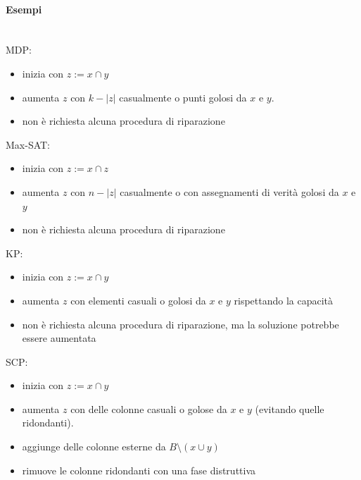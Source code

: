 \documentclass{article}
\begin{document}
\paragraph{Esempi}\mbox{}\\
MDP:
\begin{itemize}
    \item inizia con $z:=x\cap y$
    \item aumenta $z$ con $k-|z|$ casualmente o punti golosi da $x$ e $y$.
    \item non è richiesta alcuna procedura di riparazione
\end{itemize}
Max-SAT:
\begin{itemize}
    \item inizia con $z:=x\cap z$
    \item aumenta $z$ con $n-|z|$ casualmente o con assegnamenti di verità golosi da $x$ e $y$
    \item non è richiesta alcuna procedura di riparazione
\end{itemize}
KP:
\begin{itemize}
    \item inizia con $z:=x\cap y$
    \item aumenta $z$ con elementi casuali o golosi da $x$ e $y$ rispettando la capacità
    \item non è richiesta alcuna procedura di riparazione, ma la soluzione potrebbe essere aumentata
\end{itemize}
SCP:
\begin{itemize}
    \item inizia con $z:=x\cap y$
    \item aumenta $z$ con delle colonne casuali o golose da $x$ e $y$ (evitando quelle ridondanti).
    \item aggiunge delle colonne esterne da $B\setminus(x\cup y)$
    \item rimuove le colonne ridondanti con una fase distruttiva
\end{itemize}
\end{document}
